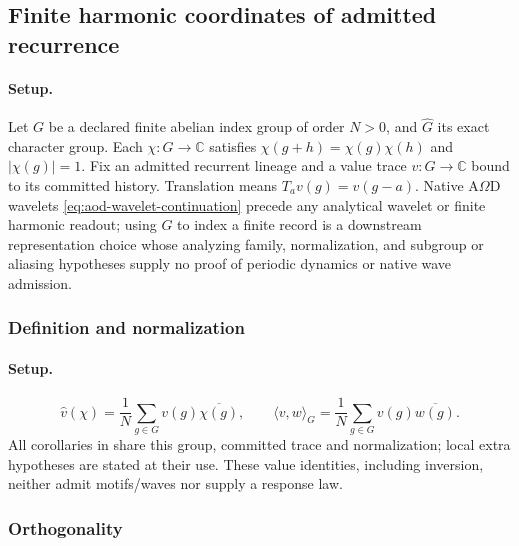 
\subsection{Finite harmonic coordinates of admitted recurrence}
\label{sec:finite-harmonics}
\paragraph{Setup.}
Let \(G\) be a declared finite abelian index group of order \(N>0\), and
\(\widehat G\) its exact character group. Each \(\chi:G\to\mathbb C\)
satisfies \(\chi(g+h)=\chi(g)\chi(h)\) and \(|\chi(g)|=1\).
Fix an admitted recurrent lineage and a value trace \(v:G\to\mathbb C\)
bound to its committed history. Translation means \(T_a v(g)=v(g-a)\).
Native A\(\Omega\)D wavelets \eqref{eq:aod-wavelet-continuation} precede any
analytical wavelet or finite harmonic readout; using \(G\) to index a finite
record is a downstream representation choice whose analyzing family,
normalization, and subgroup or aliasing hypotheses supply no proof of periodic
dynamics or native wave admission.

\subsubsection{Definition and normalization}
\paragraph{Setup.}
\begin{equation}
\widehat v(\chi)=\frac1N\sum_{g\in G}v(g)\overline{\chi(g)},
\qquad \langle v,w\rangle_G=\frac1N\sum_{g\in G}v(g)\overline{w(g)}.
\label{eq:fourier-transform}
\end{equation}
All corollaries in  share this group, committed trace and normalization;
local extra hypotheses are stated at their use. These value identities,
including inversion, neither admit motifs/waves nor supply a response law.


\subsubsection{Orthogonality}
